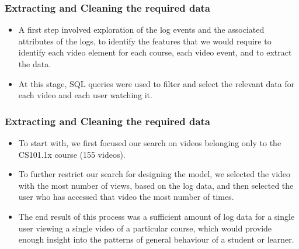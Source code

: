 \documentclass[12pt,xcolor=dvipsnames]{beamer}
\begin{document}
\begin{frame}[t]
\frametitle{Extracting and Cleaning the required data}

\vfill
\begin{itemize}
\item A first step involved exploration of the log events and the associated attributes of the logs, to identify the features that we would require to identify each video element for each course, each video event, and to extract the data.

\item At this stage, SQL queries were used to filter and select the relevant data for each video and each user watching it.

\end{itemize}

\end{frame}
\begin{frame}[t]
\frametitle{Extracting and Cleaning the required data}

\vfill
\begin{itemize}

\item To start with, we first focused our search on videos belonging only to the CS101.1x course (155 videos).

\item To further restrict our search for designing the model, we selected the video with the most number of views, based on the log data, and then selected the user who has accessed that video the most number of times.

\item The end result of this process was a sufficient amount of log data for a single user viewing a single video of a particular course, which would provide enough insight into the patterns of general behaviour of a student or learner.

\end{itemize}

\end{frame}
\end{document}
